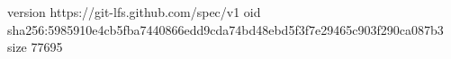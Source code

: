 version https://git-lfs.github.com/spec/v1
oid sha256:5985910e4cb5fba7440866edd9cda74bd48ebd5f3f7e29465c903f290ca087b3
size 77695
